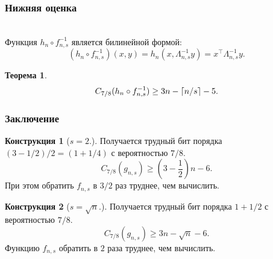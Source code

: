 \documentclass[mathserif,serif]{beamer} %
\newtheorem{thm}{Теорема}
\theoremstyle{definition}
\newtheorem{construction}{Конструкция}
\theoremstyle{remark}
\DeclarePairedDelimiter\ceil{\lceil}{\rceil}
\begin{document}
\begin{frame}
\frametitle{Нижняя оценка}
\pause
\\[1em]
Функция $h_n \circ f_{n, s}^{-1}$ является билинейной формой:
\[
(h_n \circ f_{n, s}^{-1})(x, y) = h_n(x, \Lambda_{n, s}^{-1}y) = x^\top \Lambda_{n, s}^{-1} y.
\]
\pause
\begin{thm}
\[
C_{7/8}(h_n \circ f_{n, s}^{-1}) \geq 3n - \ceil{n / s} - 5.
\]
\end{thm}
\end{frame}

\begin{frame}
  \frametitle{Заключение}
  \begin{construction}[$s = 2$.]
  Получается трудный бит порядка $(3 - 1/2) / 2 = (1 + 1/4)$ с вероятностью $7/8$.
  \[
  C_{7/8}(g_{n, s}) \geq (3 - \frac 1 2)n - 6.
  \]
  При этом обратить $f_{n, s}$ в $3/2$ раз труднее, чем вычислить.
  \end{construction}
  \pause
  \begin{construction}[$s = \sqrt{n}$.]
  Получается трудный бит порядка $1 + 1/2$ с вероятностью $7/8$.
  \[
  C_{7/8}(g_{n, s}) \geq 3n - \sqrt{n} - 6.
  \]
  Функцию $f_{n, s}$ обратить в $2$ раза труднее, чем вычислить.
  \end{construction}
\end{frame}
\end{document}
